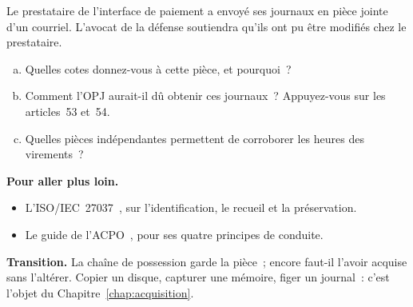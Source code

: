 \begin{boxexo}[title={\ding{45}\quad Exercice~2.4. NC-05 et le prestataire \niveauexpert}]
Le prestataire de l'interface de paiement a envoyé ses journaux en pièce
jointe d'un courriel. L'avocat de la défense soutiendra qu'ils ont pu être
modifiés chez le prestataire.
\begin{enumerate}[(a)]
    \item Quelles cotes donnez-vous à cette pièce, et pourquoi~?
    \item Comment l'OPJ aurait-il dû obtenir ces journaux~? Appuyez-vous
          sur les articles~53 et~54.
    \item Quelles pièces indépendantes permettent de corroborer les heures
          des virements~?
\end{enumerate}
\end{boxexo}

\bigskip

\begin{boxinfo}
\textbf{Pour aller plus loin.}
\begin{itemize}
    \item L'ISO/IEC~27037~\cite{iso27037_2012}, sur l'identification, le
          recueil et la préservation.
    \item Le guide de l'ACPO~\cite{acpo2012}, pour ses quatre principes de
          conduite.
\end{itemize}
\end{boxinfo}

\begin{boxinfo}
\textbf{Transition.} La chaîne de possession garde la pièce~; encore
faut-il l'avoir acquise sans l'altérer. Copier un disque, capturer une
mémoire, figer un journal~: c'est l'objet du Chapitre~\ref{chap:acquisition}.
\end{boxinfo}
